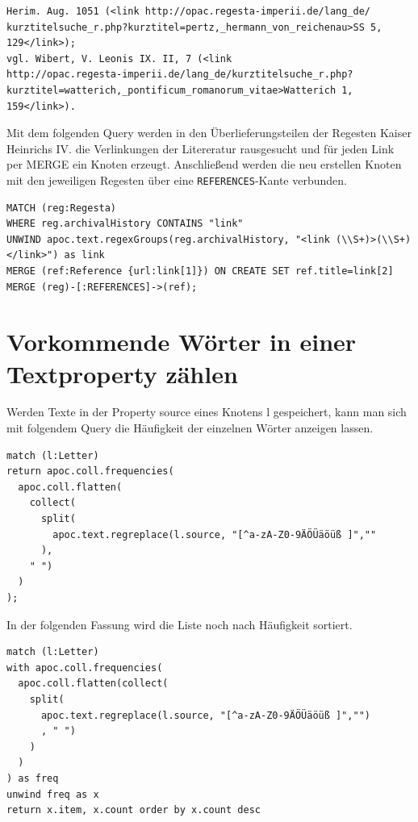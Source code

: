 \documentclass[ngerman,]{scrreprt}
\begin{document}
\begin{verbatim}
Herim. Aug. 1051 (<link http://opac.regesta-imperii.de/lang_de/
kurztitelsuche_r.php?kurztitel=pertz,_hermann_von_reichenau>SS 5, 129</link>);
vgl. Wibert, V. Leonis IX. II, 7 (<link
http://opac.regesta-imperii.de/lang_de/kurztitelsuche_r.php?
kurztitel=watterich,_pontificum_romanorum_vitae>Watterich 1, 159</link>).
\end{verbatim}

Mit dem folgenden Query werden in den Überlieferungsteilen der Regesten Kaiser Heinrichs IV. die Verlinkungen der Litereratur rausgesucht und für jeden Link per MERGE ein Knoten erzeugt. Anschließend werden die neu erstellen Knoten mit den jeweiligen Regesten über eine \texttt{REFERENCES}-Kante verbunden.

\begin{verbatim}
MATCH (reg:Regesta)
WHERE reg.archivalHistory CONTAINS "link"
UNWIND apoc.text.regexGroups(reg.archivalHistory, "<link (\\S+)>(\\S+)</link>") as link
MERGE (ref:Reference {url:link[1]}) ON CREATE SET ref.title=link[2]
MERGE (reg)-[:REFERENCES]->(ref);
\end{verbatim}

\section{Vorkommende Wörter in einer Textproperty zählen}\label{vorkommende-wuxf6rter-in-einer-textproperty-zuxe4hlen}

Werden Texte in der Property source eines Knotens l gespeichert, kann man sich mit folgendem Query die Häufigkeit der einzelnen Wörter anzeigen lassen.

\begin{verbatim}
match (l:Letter)
return apoc.coll.frequencies(
  apoc.coll.flatten(
    collect(
      split(
        apoc.text.regreplace(l.source, "[^a-zA-Z0-9ÄÖÜäöüß ]",""
      ),
    " ")
  )
);
\end{verbatim}

In der folgenden Fassung wird die Liste noch nach Häufigkeit sortiert.

\begin{verbatim}
match (l:Letter)
with apoc.coll.frequencies(
  apoc.coll.flatten(collect(
    split(
      apoc.text.regreplace(l.source, "[^a-zA-Z0-9ÄÖÜäöüß ]","")
      , " ")
    )
  )
) as freq
unwind freq as x
return x.item, x.count order by x.count desc
\end{verbatim}
\end{document}
